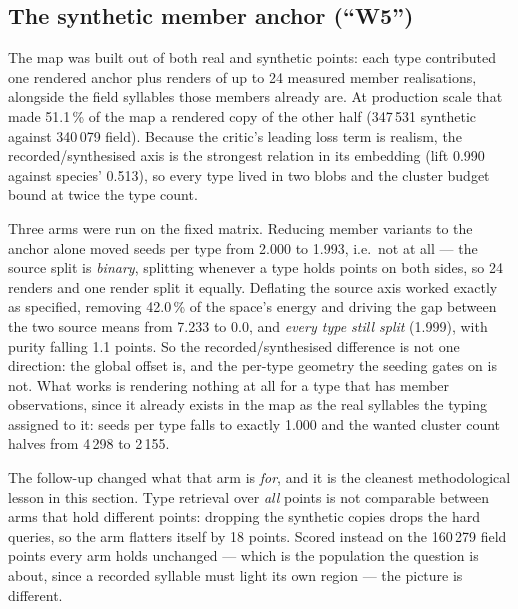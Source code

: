 \documentclass[10pt,twocolumn,a4paper]{article}
\begin{document}
\subsection{The synthetic member anchor (``W5'')}

The map was built out of both real and synthetic points: each type contributed one rendered
anchor plus renders of up to 24 measured member realisations, alongside the field syllables
those members already are. At production scale that made 51.1\,\% of the map a rendered copy
of the other half (347\,531 synthetic against 340\,079 field). Because the critic's leading
loss term is realism, the recorded/synthesised axis is the strongest relation in its
embedding (lift 0.990 against species' 0.513), so every type lived in two blobs and the
cluster budget bound at twice the type count.

Three arms were run on the fixed matrix. Reducing member variants to the anchor alone moved
seeds per type from 2.000 to 1.993, i.e.\ not at all --- the source split is
\emph{binary}, splitting whenever a type holds points on both sides, so 24 renders and one
render split it equally. Deflating the source axis worked exactly as specified, removing
42.0\,\% of the space's energy and driving the gap between the two source means from 7.233 to
0.0, and \emph{every type still split} (1.999), with purity falling 1.1 points. So the
recorded/synthesised difference is not one direction: the global offset is, and the per-type
geometry the seeding gates on is not. What works is rendering nothing at all for a type
that has member observations, since it already exists in the map as the real syllables the
typing assigned to it: seeds per type falls to exactly 1.000 and the wanted cluster count
halves from 4\,298 to 2\,155.

The follow-up changed what that arm is \emph{for}, and it is the cleanest methodological
lesson in this section. Type retrieval over \emph{all} points is not comparable between arms
that hold different points: dropping the synthetic copies drops the hard queries, so the arm
flatters itself by 18 points. Scored instead on the 160\,279 field points every arm holds
unchanged --- which is the population the question is about, since a recorded syllable must
light its own region --- the picture is different.
\end{document}
